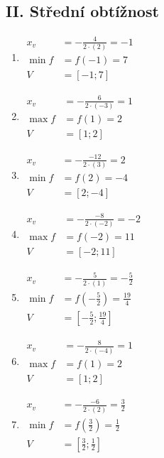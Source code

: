 \documentclass[11pt,a4paper]{article}
\begin{document}
\subsection*{II. Střední obtížnost}
\begin{enumerate}[label={},itemsep=9pt]
\item[\textbf{D010}] \(\displaystyle \begin{aligned}x_v&=-\frac{4}{2\cdot(2)}=-1\\\min f&=f(-1)=7\\V&=[-1;7]\end{aligned}\)\par
\item[\textbf{D011}] \(\displaystyle \begin{aligned}x_v&=-\frac{6}{2\cdot(-3)}=1\\\max f&=f(1)=2\\V&=[1;2]\end{aligned}\)\par
\item[\textbf{D012}] \(\displaystyle \begin{aligned}x_v&=-\frac{-12}{2\cdot(3)}=2\\\min f&=f(2)=-4\\V&=[2;-4]\end{aligned}\)\par
\item[\textbf{D013}] \(\displaystyle \begin{aligned}x_v&=-\frac{-8}{2\cdot(-2)}=-2\\\max f&=f(-2)=11\\V&=[-2;11]\end{aligned}\)\par
\item[\textbf{D014}] \(\displaystyle \begin{aligned}x_v&=-\frac{5}{2\cdot(1)}=- \frac{5}{2}\\\min f&=f(- \frac{5}{2})=\frac{19}{4}\\V&=[- \frac{5}{2};\frac{19}{4}]\end{aligned}\)\par
\item[\textbf{D015}] \(\displaystyle \begin{aligned}x_v&=-\frac{8}{2\cdot(-4)}=1\\\max f&=f(1)=2\\V&=[1;2]\end{aligned}\)\par
\item[\textbf{D016}] \(\displaystyle \begin{aligned}x_v&=-\frac{-6}{2\cdot(2)}=\frac{3}{2}\\\min f&=f(\frac{3}{2})=\frac{1}{2}\\V&=[\frac{3}{2};\frac{1}{2}]\end{aligned}\)\par

\end{enumerate}
\end{document}
